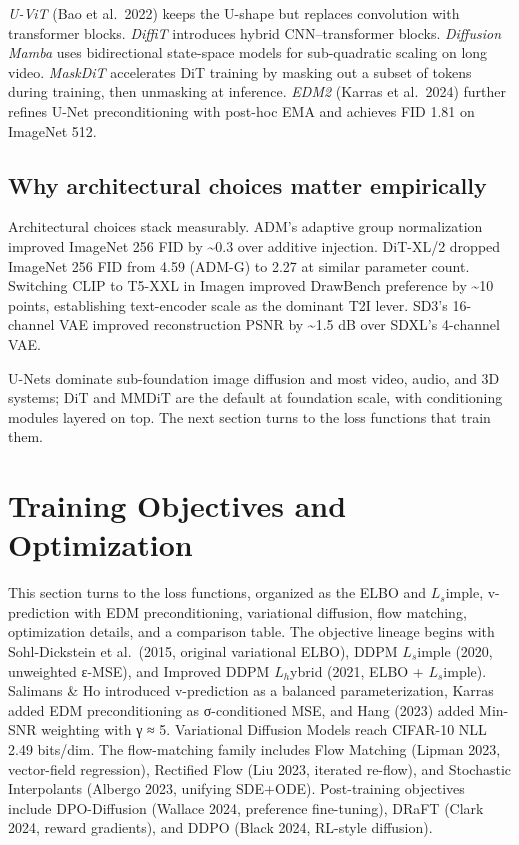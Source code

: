 \documentclass{article}
\begin{document}
\emph{U-ViT} (Bao et al.~2022) keeps the U-shape but replaces convolution with transformer blocks. \emph{DiffiT} \citep{hatamizadeh20242024} introduces hybrid CNN--transformer blocks. \emph{Diffusion Mamba} \citep{mo2024scalingdiffusionma} uses bidirectional state-space models for sub-quadratic scaling on long video. \emph{MaskDiT} \citep{gao2023maskeddiffusiontra} accelerates DiT training by masking out a subset of tokens during training, then unmasking at inference. \emph{EDM2} (Karras et al.~2024) further refines U-Net preconditioning with post-hoc EMA and achieves FID 1.81 on ImageNet 512.

\subsection{Why architectural choices matter empirically}\label{why-architectural-choices-matter-empirically}

Architectural choices stack measurably. ADM's adaptive group normalization improved ImageNet 256 FID by \textasciitilde0.3 over additive injection. DiT-XL/2 dropped ImageNet 256 FID from 4.59 (ADM-G) to 2.27 at similar parameter count. Switching CLIP to T5-XXL in Imagen improved DrawBench preference by \textasciitilde10 points, establishing text-encoder scale as the dominant T2I lever. SD3's 16-channel VAE improved reconstruction PSNR by \textasciitilde1.5 dB over SDXL's 4-channel VAE.

U-Nets dominate sub-foundation image diffusion and most video, audio, and 3D systems; DiT and MMDiT are the default at foundation scale, with conditioning modules layered on top. The next section turns to the loss functions that train them.

\section{Training Objectives and Optimization}\label{training-objectives-and-optimization}

This section turns to the loss functions, organized as the ELBO and \(L_s\)imple, v-prediction with EDM preconditioning, variational diffusion, flow matching, optimization details, and a comparison table. The objective lineage begins with Sohl-Dickstein et al.~(2015, original variational ELBO), DDPM \(L_s\)imple (2020, unweighted ε-MSE), and Improved DDPM \(L_h\)ybrid (2021, ELBO + \(L_s\)imple). Salimans \& Ho \citet{ho2022classifierfreediff} introduced v-prediction as a balanced parameterization, Karras \citet{karras2022elucidatingthedesi} added EDM preconditioning as σ-conditioned MSE, and Hang (2023) added Min-SNR weighting with γ ≈ 5. Variational Diffusion Models \citep{kingma2021variationaldiffusi} reach CIFAR-10 NLL 2.49 bits/dim. The flow-matching family includes Flow Matching (Lipman 2023, vector-field regression), Rectified Flow (Liu 2023, iterated re-flow), and Stochastic Interpolants (Albergo 2023, unifying SDE+ODE). Post-training objectives include DPO-Diffusion (Wallace 2024, preference fine-tuning), DRaFT (Clark 2024, reward gradients), and DDPO (Black 2024, RL-style diffusion).
\end{document}
